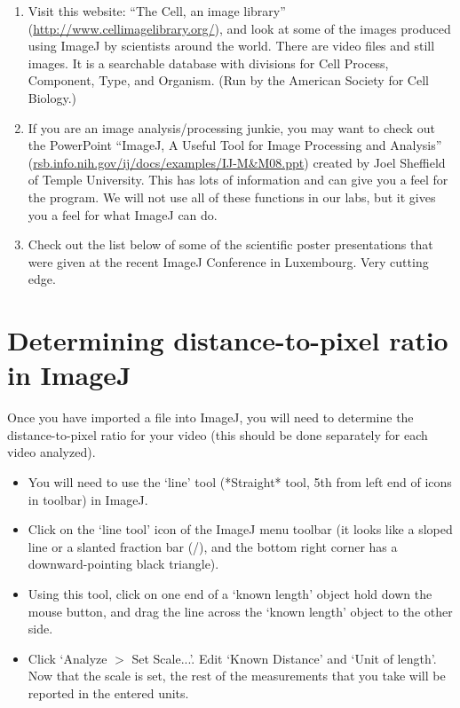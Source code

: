\begin{enumerate}
\item Visit this website: ``The Cell, an image library'' (\url{http://www.cellimagelibrary.org/}), and look at some of the images produced using ImageJ by scientists around the world. There are video files and still images. It is a searchable database with divisions for Cell Process, Component, Type, and Organism. (Run by the American Society for Cell Biology.)
\item If you are an image analysis/processing junkie, you may want to check out the PowerPoint ``ImageJ, A Useful Tool for Image Processing and Analysis'' (\url{rsb.info.nih.gov/ij/docs/examples/IJ-M&M08.ppt}) created by Joel Sheffield of Temple University. This has lots of information and can give you a feel for the program. We will not use all of these functions in our labs, but it gives you a feel for what ImageJ can do.
\item Check out the list below of some of the scientific poster presentations that were given at the recent ImageJ Conference in Luxembourg. Very cutting edge.
\end{enumerate}

\section*{Determining distance-to-pixel ratio in ImageJ}
Once you have imported a file into ImageJ, you will need to determine the distance-to-pixel ratio for your video (this should be done separately for each video analyzed). 
\begin{itemize}
\item You will need to use the `line' tool (*Straight* tool, 5th from left end of icons in toolbar) in ImageJ.
\item Click on the `line tool' icon of the ImageJ menu toolbar (it looks like a sloped line or a slanted fraction bar (/), and the bottom right corner has a downward-pointing black triangle). 
\item Using this tool, click on one end of a `known length’ object hold down the mouse button, and drag the line across the `known length’ object to the other side. 
\item Click `Analyze $>$ Set Scale...'. Edit `Known Distance' and `Unit of length'. Now that the scale is set, the rest of the measurements that you take will be reported in the entered units.
\end{itemize}

